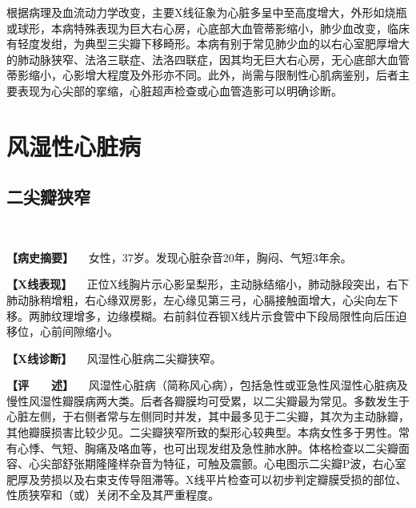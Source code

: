 根据病理及血流动力学改变，主要X线征象为心脏多呈中至高度增大，外形如烧瓶或球形，本病特殊表现为巨大右心房，心底部大血管蒂影缩小，肺少血改变，临床有轻度发绀，为典型三尖瓣下移畸形。本病有别于常见肺少血的以右心室肥厚增大的肺动脉狭窄、法洛三联症、法洛四联症，因其均无巨大右心房，无心底部大血管蒂影缩小，心影增大程度及外形亦不同。此外，尚需与限制性心肌病鉴别，后者主要表现为心尖部的挛缩，心脏超声检查或心血管造影可以明确诊断。

\section{风湿性心脏病}

\subsection{二尖瓣狭窄}

\begin{figure}
  \centering
{}
\\
\caption{}
\label{fig4-3-1}
\end{figure}

\textbf{【病史摘要】} 　女性，37岁。发现心脏杂音20年，胸闷、气短3年余。

\textbf{【X线表现】}
　正位X线胸片示心影呈梨形，主动脉结缩小，肺动脉段突出，右下肺动脉稍增粗，右心缘双房影，左心缘见第三弓，心膈接触面增大，心尖向左下移。两肺纹理增多，边缘模糊。右前斜位吞钡X线片示食管中下段局限性向后压迫移位，心前间隙缩小。

\textbf{【X线诊断】} 　风湿性心脏病二尖瓣狭窄。

\textbf{【评　　述】}
　风湿性心脏病（简称风心病），包括急性或亚急性风湿性心脏病及慢性风湿性瓣膜病两大类。后者各瓣膜均可受累，以二尖瓣最为常见。多数发生于心脏左侧，于右侧者常与左侧同时并发，其中最多见于二尖瓣，其次为主动脉瓣，其他瓣膜损害比较少见。二尖瓣狭窄所致的梨形心较典型。本病女性多于男性。常有心悸、气短、胸痛及咯血等，也可出现发绀及急性肺水肿。体格检查以二尖瓣面容、心尖部舒张期隆隆样杂音为特征，可触及震颤。心电图示二尖瓣P波，右心室肥厚及劳损以及右束支传导阻滞等。X线平片检查可以初步判定瓣膜受损的部位、性质狭窄和（或）关闭不全及其严重程度。

